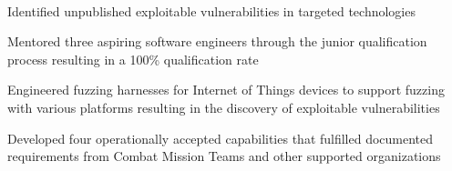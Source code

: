 \documentclass[]{resume}
\begin{document}
\begin{minipage}[t]{0.69\textwidth}
 \\
\begin{tightemize}
\item Identified unpublished exploitable vulnerabilities in targeted technologies
\item Mentored three aspiring software engineers through the junior qualification process resulting in a 100\% qualification rate
\item Engineered fuzzing harnesses for Internet of Things devices to support fuzzing with various platforms resulting in the discovery of exploitable vulnerabilities
\item Developed four operationally accepted capabilities that fulfilled documented requirements from Combat Mission Teams and other supported organizations
\end{tightemize}

\sectionsep


\end{minipage}
\end{document}
